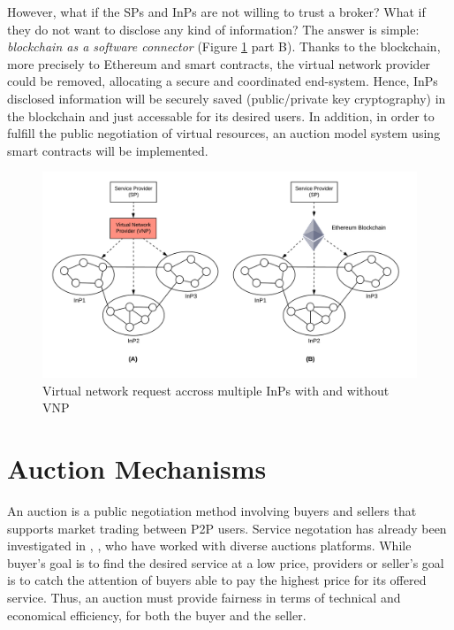 However, what if the SPs and InPs are not willing to trust a broker? What if they do not want to disclose any kind of information? The answer is simple: \textit{blockchain as a software connector} (Figure \ref{fig:multiprov} part B). Thanks to the blockchain, more precisely to Ethereum and smart contracts, the virtual network provider could be removed, allocating a secure and coordinated end-system. Hence, InPs disclosed information will be securely saved (public/private key cryptography) in the blockchain and just accessable for its desired users. In addition, in order to fulfill the public negotiation of virtual resources, an auction model system using smart contracts will be implemented.

\begin{figure}
  \centering
  	\includegraphics[scale=0.7]{gfx/multiprov.png}
  \caption{Virtual network request accross multiple InPs with and without VNP}
  \label{fig:multiprov}
\end{figure}

\section{Auction Mechanisms}

An auction is a public negotiation method involving buyers and sellers that supports market trading between P2P users. Service negotation has already been investigated in \citep{hausheer2005peermart}, \cite{ogston2002peer}, who have worked with diverse auctions platforms. While buyer's goal is to find the desired service at a low price, providers or seller's goal is to catch the attention of buyers able to pay the highest price for its offered service. Thus, an auction must provide fairness in terms of technical and economical efficiency, for both the buyer and the seller.

